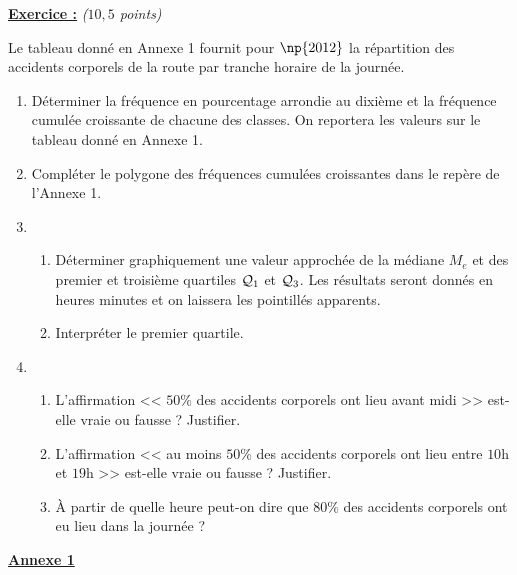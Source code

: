 \documentclass[12pt,french]{book}
\renewenvironment{exo}[1]{%
  \refstepcounter{exo}\underline{\textbf{Exercice \theexo :}} \quad \textit{#1}\par
  \medskip}%
{\bigskip}
\begin{document}
\begin{exo}{($10,5$ points)}
    Le tableau donné en Annexe 1 fournit pour $\np{2012}$ la répartition des accidents corporels de la route par tranche horaire de la journée.
    
    \begin{enumerate}
        \item Déterminer la fréquence en pourcentage arrondie au dixième et la fréquence cumulée croissante de chacune des classes. On reportera les valeurs sur le tableau donné en Annexe 1.
        \item Compléter le polygone des fréquences cumulées croissantes dans le repère de l'Annexe 1.
        \item
            \begin{enumerate}
                \item Déterminer graphiquement une valeur approchée de la médiane $M_e$ et des premier et troisième quartiles $\mathcal{Q}_1$ et $\mathcal{Q}_3$. Les résultats seront donnés en heures minutes et on laissera les pointillés apparents.
                \item Interpréter le premier quartile.
            \end{enumerate}
        \item
            \begin{enumerate}
                \item L'affirmation << $50\%$ des accidents corporels ont lieu avant midi >> est-elle vraie ou fausse ? Justifier.
                \item L'affirmation << au moins $50\%$ des accidents corporels ont lieu entre $10$h et $19$h >> est-elle vraie ou fausse ? Justifier.
                \item À partir de quelle heure peut-on dire que $80\%$ des accidents corporels ont eu lieu dans la journée ?
            \end{enumerate}
    \end{enumerate}
\end{exo}

\clearpage

\begin{center}
    \underline{\textbf{Annexe 1}}
\end{center}\bigskip
\end{document}
